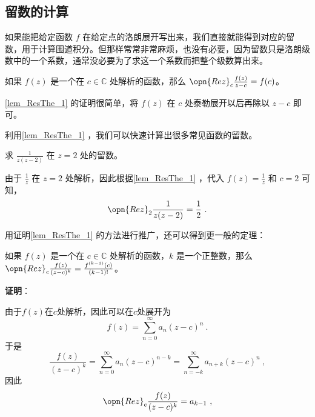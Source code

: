 \subsection{留数的计算}



如果能把给定函数 $f$ 在给定点的洛朗展开写出来，我们直接就能得到对应的留数，用于计算围道积分。但那样常常非常麻烦，也没有必要，因为留数只是洛朗级数中的一个系数，通常没必要为了求这一个系数而把整个级数算出来。

\begin{lemma}{}\label{lem_ResThe_1}
如果 $f(z)$ 是一个在 $c\in\mathbb{C}$ 处解析的函数，那么 $\opn{Rez}_c\frac{f(z)}{z-c}=f(c)$。
\end{lemma}

\autoref{lem_ResThe_1} 的证明很简单，将 $f(z)$ 在 $c$ 处泰勒展开以后再除以 $z-c$ 即可。

利用\autoref{lem_ResThe_1} ，我们可以快速计算出很多常见函数的留数。

\begin{example}{}
求 $\frac{1}{z(z-2)}$ 在 $z=2$ 处的留数。

由于 $\frac{1}{z}$ 在 $z=2$ 处解析，因此根据\autoref{lem_ResThe_1} ，代入 $f(z)=\frac{1}{z}$ 和 $c=2$ 可知，
\begin{equation}
\opn{Rez}_2\frac{1}{z(z-2)}=\frac{1}{2}~.
\end{equation}
\end{example}

用证明\autoref{lem_ResThe_1} 的方法进行推广，还可以得到更一般的定理：

\begin{theorem}{}\label{the_ResThe_2}
如果 $f(z)$ 是一个在 $c\in\mathbb{C}$ 处解析的函数，$k$ 是一个正整数，那么 $\opn{Rez}_c\frac{f(z)}{(z-c)^k}=\frac{f^{(k-1)}(c)}{(k-1)!}$。
\end{theorem}

\textbf{证明}：

由于$f(z)$在$c$处解析，因此可以在$c$处展开为
\begin{equation}
f(z) = \sum_{n=0}^\infty a_n(z-c)^n~.
\end{equation}
于是
\begin{equation}
\frac{f(z)}{(z-c)^k} = \sum_{n=0}^\infty a_n(z-c)^{n-k} = \sum_{n=-k}^\infty a_{n+k}(z-c)^n~,
\end{equation}
因此
\begin{equation}
\opn{Rez}_c\frac{f(z)}{(z-c)^k} = a_{k-1}~,
\end{equation}

